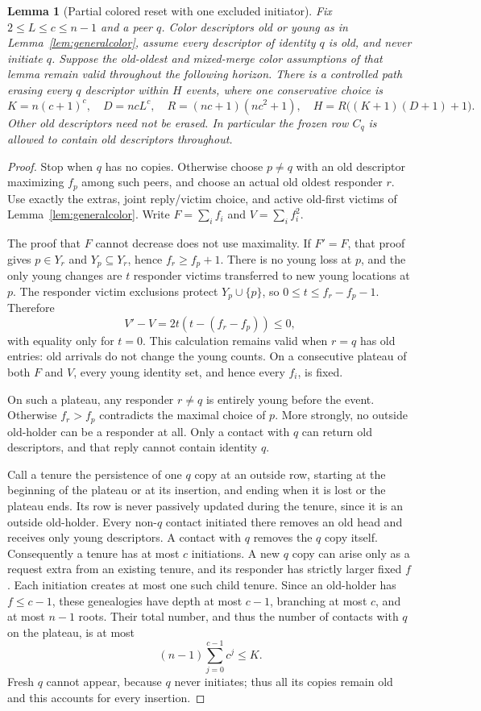 \documentclass[11pt]{article}
\newtheorem{lemma}[theorem]{Lemma}
\begin{document}
\begin{lemma}[Partial colored reset with one excluded initiator]
\label{lem:partialcolorsource}
Fix $2\le L\le c\le n-1$ and a peer $q$. Color descriptors old or
young as in Lemma~\ref{lem:generalcolor}, assume every descriptor of
identity $q$ is old, and never initiate $q$. Suppose the old-oldest and
mixed-merge color assumptions of that lemma remain valid throughout the
following horizon. There is a controlled path erasing every $q$
descriptor within $H$ events, where one conservative choice is
\[
 K=n(c+1)^c,\quad D=ncL^c,\quad
 R=(nc+1)(nc^2+1),\quad
 H=R\bigl((K+1)(D+1)+1\bigr).
\]
Other old descriptors need not be erased. In particular the frozen
row $C_q$ is allowed to contain old descriptors throughout.
\end{lemma}
\begin{proof}
Stop when $q$ has no copies. Otherwise choose $p\ne q$ with an old
descriptor maximizing $f_p$ among such peers, and choose an actual
old oldest responder $r$. Use exactly the extras, joint reply/victim
choice, and active old-first victims of Lemma~\ref{lem:generalcolor}.
Write $F=\sum_i f_i$ and $V=\sum_i f_i^2$.

The proof that $F$ cannot decrease does not use maximality. If
$F'=F$, that proof gives $p\in Y_r$ and $Y_p\subseteq Y_r$, hence
$f_r\ge f_p+1$. There is no young loss at $p$, and the only young
changes are $t$ responder victims transferred to new young locations
at $p$. The responder victim exclusions protect $Y_p\cup\{p\}$,
so $0\le t\le f_r-f_p-1$. Therefore
\[
 V'-V=2t(t-(f_r-f_p))\le0,
\]
with equality only for $t=0$. This calculation remains valid when
$r=q$ has old entries: old arrivals do not change the young counts.
On a consecutive plateau of both $F$ and $V$, every young identity
set, and hence every $f_i$, is fixed.

On such a plateau, any responder $r\ne q$ is entirely young before
the event. Otherwise $f_r>f_p$ contradicts the maximal choice of $p$.
More strongly, no outside old-holder can be a responder at all.
Only a contact with $q$ can return old descriptors, and that reply
cannot contain identity $q$.

Call a tenure the persistence of one $q$ copy at an outside row,
starting at the beginning of the plateau or at its insertion, and
ending when it is lost or the plateau ends. Its row is never passively
updated during the tenure, since it is an outside old-holder. Every
non-$q$ contact initiated there removes an old head and receives only
young descriptors. A contact with $q$ removes the $q$ copy itself.
Consequently a tenure has at most $c$ initiations. A new $q$ copy
can arise only as a request extra from an existing tenure, and its
responder has strictly larger fixed $f$. Each initiation creates at
most one such child tenure. Since an old-holder has $f\le c-1$,
these genealogies have depth at most $c-1$, branching at most $c$,
and at most $n-1$ roots. Their total number, and thus the number of
contacts with $q$ on the plateau, is at most
\[
 (n-1)\sum_{j=0}^{c-1}c^j\le K.
\]
Fresh $q$ cannot appear, because $q$ never initiates; thus all its
copies remain old and this accounts for every insertion.


\end{proof}
\end{document}
